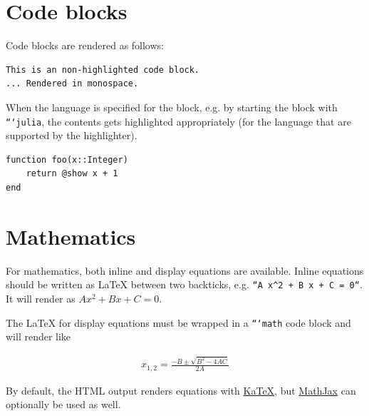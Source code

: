 \section{Code blocks}



\label{11866632528091199169}{}


Code blocks are rendered as follows:




\begin{verbatim}
This is an non-highlighted code block.
... Rendered in monospace.
\end{verbatim}



When the language is specified for the block, e.g. by starting the block with \texttt{```julia}, the contents gets highlighted appropriately (for the language that are supported by the highlighter).




\begin{verbatim}
function foo(x::Integer)
    return @show x + 1
end
\end{verbatim}



\section{Mathematics}



\label{3333540001399501351}{}


For mathematics, both inline and display equations are available.
Inline equations should be written as LaTeX between two backticks,
e.g. \texttt{``A x{\textasciicircum}2 + B x + C = 0``}.
It will render as \(A x^2 + B x + C = 0\).



The LaTeX for display equations must be wrapped in a \texttt{```math} code block and will render like



\begin{equation*}
\begin{split}x_{1,2} = \frac{-B \pm \sqrt{B^2 - 4 A C}}{2A}\end{split}\end{equation*}


By default, the HTML output renders equations with \href{https://katex.org/}{KaTeX}, but \href{https://www.mathjax.org/}{MathJax} can optionally be used as well.



